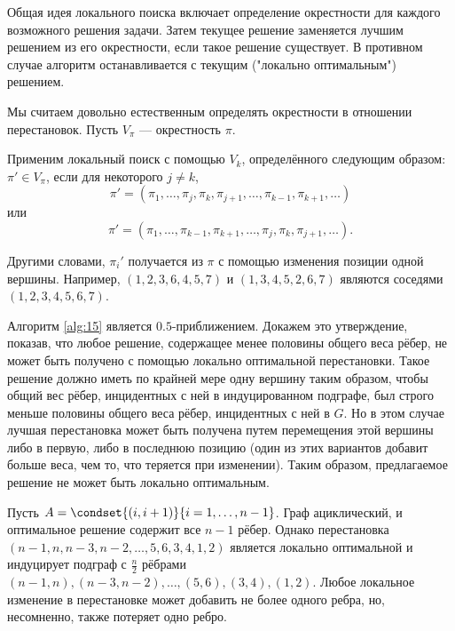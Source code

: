 \documentclass[a4paper, 12pt, oneside]{extarticle}  %
\begin{document}
Общая идея локального поиска включает определение окрестности для каждого возможного решения задачи. Затем текущее решение заменяется лучшим решением из его окрестности, если такое решение существует. В противном случае алгоритм останавливается с текущим ("локально оптимальным") решением.


Мы считаем довольно естественным определять окрестности в отношении перестановок. Пусть $V_{\pi}$ --- окрестность $\pi$.

\begin{algo}\label{alg:15}
  Применим локальный поиск с помощью $V_k$, определённого следующим образом: $\pi' \in V_{\pi}$, если для некоторого $j \neq k$,
  \[\pi' = (\pi_1,\ldots,\pi_j,\pi_k,\pi_{j+1},\ldots,\pi_{k-1},\pi_{k+1},\ldots)\]
  или
  \[\pi'=(\pi_1,\ldots,\pi_{k-1},\pi_{k+1},\ldots,\pi_j,\pi_k,\pi_{j+1},\ldots).\]

  Другими словами, $\pi_i'$ получается из $\pi$ с помощью изменения позиции одной вершины. Например, $(1, 2, 3, 6, 4, 5, 7)$ и $(1, 3, 4, 5, 2, 6, 7)$ являются соседями $(1, 2, 3, 4, 5, 6, 7)$.

  Алгоритм \ref{alg:15} является $0.5$-приближением. Докажем это утверждение, показав, что любое решение, содержащее менее половины общего веса рёбер, не может быть получено с помощью локально оптимальной перестановки. Такое решение должно иметь по крайней мере одну вершину таким образом, чтобы общий вес рёбер, инцидентных с ней в индуцированном подграфе, был строго меньше половины общего веса
  рёбер, инцидентных с ней в $G$. Но в этом случае лучшая перестановка может быть получена путем перемещения этой вершины либо в первую, либо в последнюю позицию (один из этих вариантов добавит больше веса, чем то, что теряется при изменении). Таким образом, предлагаемое решение не может быть локально оптимальным.
\end{algo}

\begin{example}\label{examp:16}
  Пусть $A = \condset{(i, i+1)}{i=1,\ldots,n-1}$. Граф ациклический, и оптимальное решение содержит все $n-1$ рёбер. Однако перестановка $(n-1, n, n-3, n-2,\ldots, 5, 6, 3, 4, 1, 2)$ является локально оптимальной и индуцирует подграф с $\frac{n}{2}$ рёбрами $(n-1, n), (n-3, n-2), \ldots, (5, 6), (3, 4), (1, 2)$. Любое локальное изменение в перестановке может добавить не более одного ребра, но, несомненно, также потеряет одно ребро.
\end{example}
\end{document}
